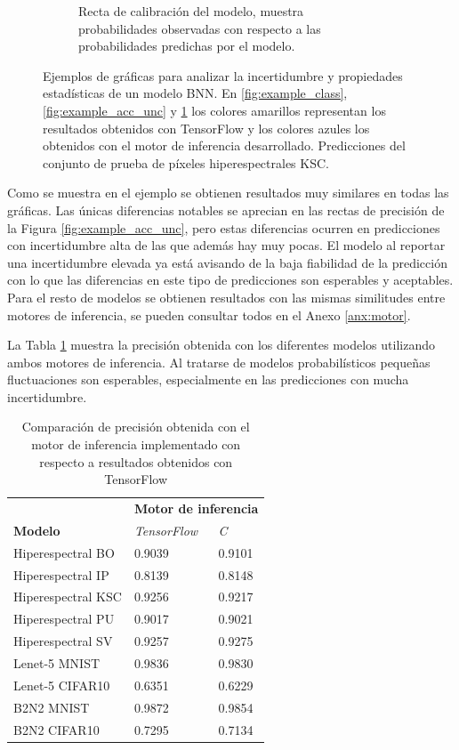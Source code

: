 \begin{figure}[h]
\begin{subfigure}[b]{0.48\textwidth}
     	\caption{Recta de calibración del modelo, muestra probabilidades observadas con respecto a las probabilidades predichas por el modelo.}
     	\label{fig:example_calibration}
 	\end{subfigure}
    	\caption{Ejemplos de gráficas para analizar la incertidumbre y propiedades estadísticas de un modelo BNN. En \ref{fig:example_class}, \ref{fig:example_acc_unc} y \ref{fig:example_calibration} los colores amarillos representan los resultados obtenidos con TensorFlow y los colores azules los obtenidos con el motor de inferencia desarrollado. Predicciones del conjunto de prueba de píxeles hiperespectrales KSC.}
    	\label{fig:figure_example}
\end{figure}

Como se muestra en el ejemplo se obtienen resultados muy similares en todas las gráficas. Las únicas diferencias notables se aprecian en las rectas de precisión de la Figura \ref{fig:example_acc_unc}, pero estas diferencias ocurren en predicciones con incertidumbre alta de las que además hay muy pocas. El modelo al reportar una incertidumbre elevada ya está avisando de la baja fiabilidad de la predicción con lo que las diferencias en este tipo de predicciones son esperables y aceptables. Para el resto de modelos se obtienen resultados con las mismas similitudes entre motores de inferencia, se pueden consultar todos en el Anexo \ref{anx:motor}.

La Tabla \ref{tab:engine_acc} muestra la precisión obtenida con los diferentes modelos utilizando ambos motores de inferencia. Al tratarse de modelos probabilísticos pequeñas fluctuaciones son esperables, especialmente en las predicciones con mucha incertidumbre.

\begin{table}[ht]
\centering
\caption{Comparación de precisión obtenida con el motor de inferencia implementado con respecto a resultados obtenidos con TensorFlow}
\label{tab:engine_acc}
\begin{tabular}{lll}
\hline
 &  \multicolumn{2}{c}{\textbf{Motor de inferencia}}\\
 \textbf{Modelo} & \textit{TensorFlow} & \textit{C} \\ \hline
 Hiperespectral BO   & 0.9039 & 0.9101 \\
 Hiperespectral IP   & 0.8139 & 0.8148 \\
 Hiperespectral KSC  & 0.9256 & 0.9217 \\
 Hiperespectral PU   & 0.9017 & 0.9021 \\
 Hiperespectral SV   & 0.9257 & 0.9275 \\
 Lenet-5 MNIST  	& 0.9836 & 0.9830 \\
 Lenet-5 CIFAR10	& 0.6351 & 0.6229 \\
 B2N2 MNIST     	& 0.9872 & 0.9854 \\
 B2N2 CIFAR10   	& 0.7295 & 0.7134 \\\hline
\end{tabular}
\end{table}

